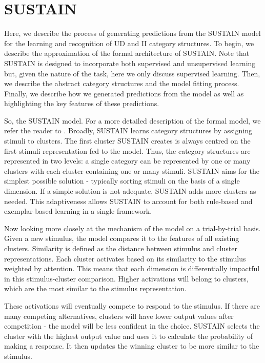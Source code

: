 \documentclass[12pt]{article}
\begin{document}
\section{SUSTAIN}
Here, we describe the process of generating predictions from the SUSTAIN model for the learning and recognition of UD and II category structures. 
To begin, we describe the approximation of the formal architecture of SUSTAIN.
Note that SUSTAIN is designed to incorporate both supervised and unsupervised learning but, given the nature of the task, here we only discuss supervised learning.
Then, we describe the abstract category structures and the model fitting process. 
Finally, we describe how we generated predictions from the model as well as highlighting the key features of these predictions. 

So, the SUSTAIN model. 
For a more detailed description of the formal model, we refer the reader to . 
Broadly, SUSTAIN learns category structures by assigning stimuli to clusters. 
The first cluster SUSTAIN creates is always centred on the first stimuli representation fed to the model.
Thus, the category structures are represented in two levels: a single category can be represented by one or many clusters with each cluster containing one or many stimuli. 
SUSTAIN aims for the simplest possible solution - typically sorting stimuli on the basis of a single dimension.
If a simple solution is not adequate, SUSTAIN adds more clusters as needed. 
This adaptiveness allows SUSTAIN to account for both rule-based and exemplar-based learning in a single framework. 

Now looking more closely at the mechanism of the model on a trial-by-trial basis. 
Given a new stimulus, the model compares it to the features of all existing clusters.
Similarity is defined as the distance between stimulus and cluster representations.
Each cluster activates based on its similarity to the stimulus weighted by attention.
This means that each dimension is differentially impactful in this stimulus-cluster comparison.
Higher activations will belong to clusters, which are the most similar to the stimulus representation. 

These activations will eventually compete to respond to the stimulus.
If there are many competing alternatives, clusters will have lower output 
values after competition - the model will be less confident in the
choice. 
SUSTAIN selects the cluster with the highest output value and uses it to
calculate the probability of making a response. 
It then updates the winning cluster to be more similar to the stimulus.
\end{document}

